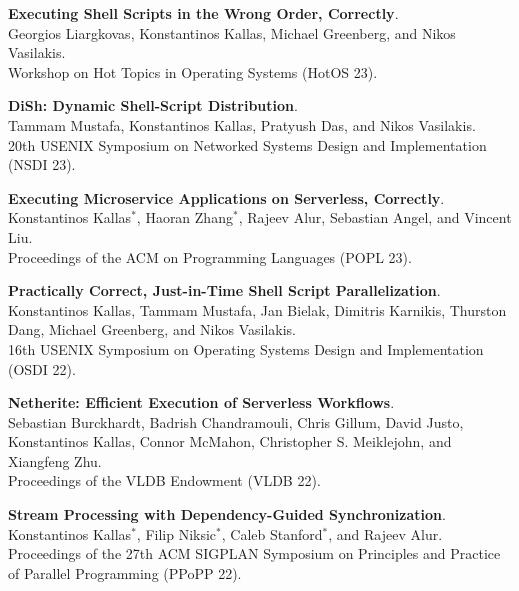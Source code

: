 \begin{minipage}{\textwidth}
\textbf{Executing Shell Scripts in the Wrong Order, Correctly}. \\
Georgios Liargkovas, Konstantinos Kallas, Michael Greenberg, and Nikos Vasilakis. \\
Workshop on Hot Topics in Operating Systems (HotOS 23).
\end{minipage}

\begin{minipage}{\textwidth}
\textbf{DiSh: Dynamic Shell-Script Distribution}. \\
Tammam Mustafa, Konstantinos Kallas, Pratyush Das, and Nikos Vasilakis. \\
20th USENIX Symposium on Networked Systems Design and Implementation (NSDI 23).
\end{minipage}

\begin{minipage}{\textwidth}
\textbf{Executing Microservice Applications on Serverless, Correctly}. \\
Konstantinos Kallas$^*$, Haoran Zhang$^*$, Rajeev Alur, Sebastian Angel, and Vincent Liu. \\
Proceedings of the ACM on Programming Languages (POPL 23).
\end{minipage}

\begin{minipage}{\textwidth}
\textbf{Practically Correct, Just-in-Time Shell Script Parallelization}. \\
Konstantinos Kallas, Tammam Mustafa, Jan Bielak, Dimitris Karnikis, Thurston Dang, Michael Greenberg, and Nikos Vasilakis. \\
16th USENIX Symposium on Operating Systems Design and Implementation (OSDI 22).
\end{minipage}

\begin{minipage}{\textwidth}
\textbf{Netherite: Efficient Execution of Serverless Workflows}. \\
Sebastian Burckhardt, Badrish Chandramouli, Chris Gillum, David Justo, Konstantinos Kallas, Connor McMahon, Christopher S. Meiklejohn, and Xiangfeng Zhu. \\
Proceedings of the VLDB Endowment (VLDB 22).
\end{minipage}

\begin{minipage}{\textwidth}
\textbf{Stream Processing with Dependency-Guided Synchronization}. \\
Konstantinos Kallas$^*$, Filip Niksic$^*$, Caleb Stanford$^*$, and Rajeev Alur. \\
Proceedings of the 27th ACM SIGPLAN Symposium on Principles and Practice of Parallel Programming (PPoPP 22).
\end{minipage}

